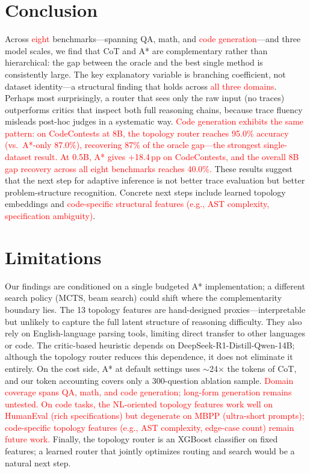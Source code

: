 \documentclass[10pt]{article}
\begin{document}
\section{Conclusion}
Across \textcolor{red}{eight} benchmarks---spanning QA, math, and \textcolor{red}{code generation}---and three model scales, we find that CoT and A* are complementary rather than hierarchical: the gap between the oracle and the best single method is consistently large. The key explanatory variable is branching coefficient, not dataset identity---a structural finding that holds across \textcolor{red}{all three domains}. Perhaps most surprisingly, a router that sees only the raw input (no traces) outperforms critics that inspect both full reasoning chains, because trace fluency misleads post-hoc judges in a systematic way. \textcolor{red}{Code generation exhibits the same pattern: on CodeContests at 8B, the topology router reaches 95.0\% accuracy (vs.\ A*-only 87.0\%), recovering 87\% of the oracle gap---the strongest single-dataset result. At 0.5B, A* gives +18.4\,pp on CodeContests, and the overall 8B gap recovery across all eight benchmarks reaches 40.0\%.} These results suggest that the next step for adaptive inference is not better trace evaluation but better problem-structure recognition. Concrete next steps include learned topology embeddings and \textcolor{red}{code-specific structural features (e.g., AST complexity, specification ambiguity)}.

\section*{Limitations}
\label{sec:limitations}
Our findings are conditioned on a single budgeted A* implementation; a different search policy (MCTS, beam search) could shift where the complementarity boundary lies. The 13 topology features are hand-designed proxies---interpretable but unlikely to capture the full latent structure of reasoning difficulty. They also rely on English-language parsing tools, limiting direct transfer to other languages or code. The critic-based heuristic depends on DeepSeek-R1-Distill-Qwen-14B; although the topology router reduces this dependence, it does not eliminate it entirely. On the cost side, A* at default settings uses $\sim$24$\times$ the tokens of CoT, and our token accounting covers only a 300-question ablation sample. \textcolor{red}{Domain coverage spans QA, math, and code generation; long-form generation remains untested. On code tasks, the NL-oriented topology features work well on HumanEval (rich specifications) but degenerate on MBPP (ultra-short prompts); code-specific topology features (e.g., AST complexity, edge-case count) remain future work.} Finally, the topology router is an XGBoost classifier on fixed features; a learned router that jointly optimizes routing and search would be a natural next step.
\end{document}
